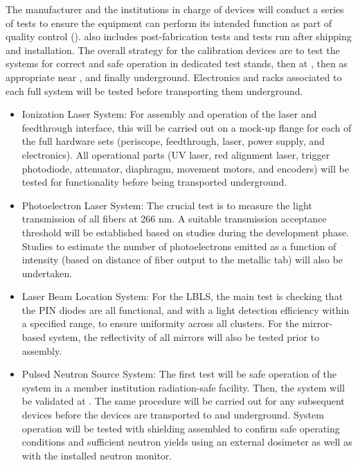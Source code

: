 The manufacturer and the institutions in charge of devices will
conduct a series of tests to ensure the equipment can perform its
intended function as part of quality control (). 
also includes post-fabrication tests and tests run after shipping and
installation. The overall strategy for the calibration devices are to
test the systems for correct and safe operation in dedicated test
stands, then at , then as appropriate near ,
and finally underground. Electronics and racks associated to each full
system will be tested before transporting them underground.
\begin{itemize}
\item Ionization Laser System: For assembly and operation of the laser
  and feedthrough interface, this will be carried out on a mock-up
  flange for each of the full hardware sets (periscope, feedthrough,
  laser, power supply, and electronics). All operational parts (UV
  laser, red alignment laser, trigger photodiode, attenuator,
  diaphragm, movement motors, and encoders) will be tested for
  functionality before being transported underground.
\item Photoelectron Laser System: The crucial test is to measure the
  light transmission of all fibers at 266 nm. A suitable transmission
  acceptance threshold will be established based on studies during the
  development phase. Studies to estimate the number of photoelectrons
  emitted as a function of intensity (based on distance of fiber
  output to the metallic tab) will also be undertaken.
\item Laser Beam Location System: For the LBLS, the main test is
  checking that the PIN diodes are all functional, and with a light
  detection efficiency within a specified range, to ensure uniformity
  across all clusters. For the mirror-based system, the reflectivity
  of all mirrors will also be tested prior to assembly.
\item Pulsed Neutron Source System: The first test will be safe
  operation of the system in a member institution radiation-safe
  facility. Then, the system will be validated at . The
  same procedure will be carried out for any subsequent devices before
  the devices are transported to  and underground. System
  operation will be tested with shielding assembled to confirm safe
  operating conditions and sufficient neutron yields using an external
  dosimeter as well as with the installed neutron monitor.
\end{itemize}

